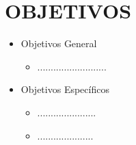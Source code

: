 \chapter*{OBJETIVOS}
\begin{itemize}
	\item Objetivos General
	\begin{itemize}
		\item .......................... 
	\end{itemize}
	\item Objetivos Específicos
	\begin{itemize}
		\item......................
		\item .....................
	\end{itemize}
\end{itemize}
